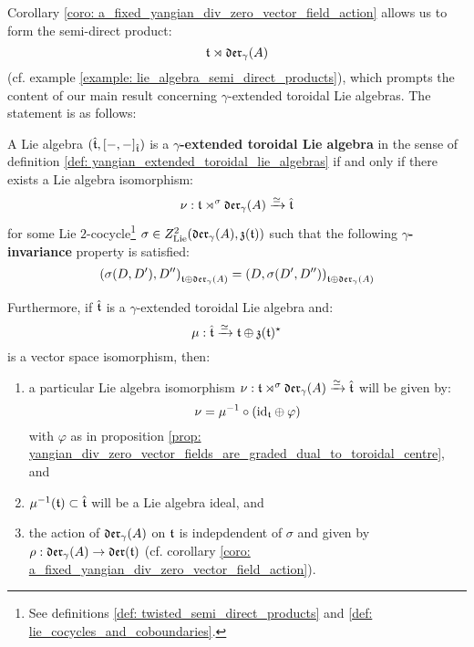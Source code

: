         Corollary \ref{coro: a_fixed_yangian_div_zero_vector_field_action} allows us to form the semi-direct product:
            $$\mathfrak{t} \rtimes \mathfrak{der}_{\gamma}(A)$$
        (cf. example \ref{example: lie_algebra_semi_direct_products}), which prompts the content of our main result concerning $\gamma$-extended toroidal Lie algebras. The statement is as follows:
        \begin{theorem} \label{theorem: yangian_extended_toroidal_lie_algebras_main_theorem}
            A Lie algebra $(\hat{\mathfrak{t}}, [-, -]_{\hat{\mathfrak{t}}})$ is a \textbf{$\gamma$-extended toroidal Lie algebra} in the sense of definition \ref{def: yangian_extended_toroidal_lie_algebras} if and only if there exists a Lie algebra isomorphism:
                $$\nu: \mathfrak{t} \rtimes^{\sigma} \mathfrak{der}_{\gamma}(A) \xrightarrow[]{\simeq} \hat{\mathfrak{t}}$$
            for some Lie $2$-cocycle\footnote{See definitions \ref{def: twisted_semi_direct_products} and \ref{def: lie_cocycles_and_coboundaries}.} $\sigma \in Z^2_{\mathrm{Lie}}(\mathfrak{der}_{\gamma}(A), \mathfrak{z}(\mathfrak{t}))$ such that the following \textbf{$\gamma$-invariance} property is satisfied:
                $$\left( \sigma(D, D'), D'' \right)_{\mathfrak{t} \oplus \mathfrak{der}_{\gamma}(A)} = \left( D, \sigma(D', D'') \right)_{\mathfrak{t} \oplus \mathfrak{der}_{\gamma}(A)}$$
                
            Furthermore, if $\hat{\mathfrak{t}}$ is a $\gamma$-extended toroidal Lie algebra and:
                $$\mu: \hat{\mathfrak{t}} \xrightarrow[]{\simeq} \mathfrak{t} \oplus \mathfrak{z}(\mathfrak{t})^{\star}$$
            is a vector space isomorphism, then:
            \begin{enumerate}
                \item a particular Lie algebra isomorphism $\nu: \mathfrak{t} \rtimes^{\sigma} \mathfrak{der}_{\gamma}(A) \xrightarrow[]{\simeq} \hat{\mathfrak{t}}$ will be given by:
                    $$\nu = \mu^{-1} \circ (\mathrm{id}_{\mathfrak{t}} \oplus \varphi)$$
                with $\varphi$ as in proposition \ref{prop: yangian_div_zero_vector_fields_are_graded_dual_to_toroidal_centre}, and
                \item $\mu^{-1}(\mathfrak{t}) \subset \hat{\mathfrak{t}}$ will be a Lie algebra ideal, and
                \item the action of $\mathfrak{der}_{\gamma}(A)$ on $\mathfrak{t}$ is indepdendent of $\sigma$ and given by $\rho: \mathfrak{der}_{\gamma}(A) \to \mathfrak{der}(\mathfrak{t})$ (cf. corollary \ref{coro: a_fixed_yangian_div_zero_vector_field_action}).
            \end{enumerate}
        \end{theorem}
